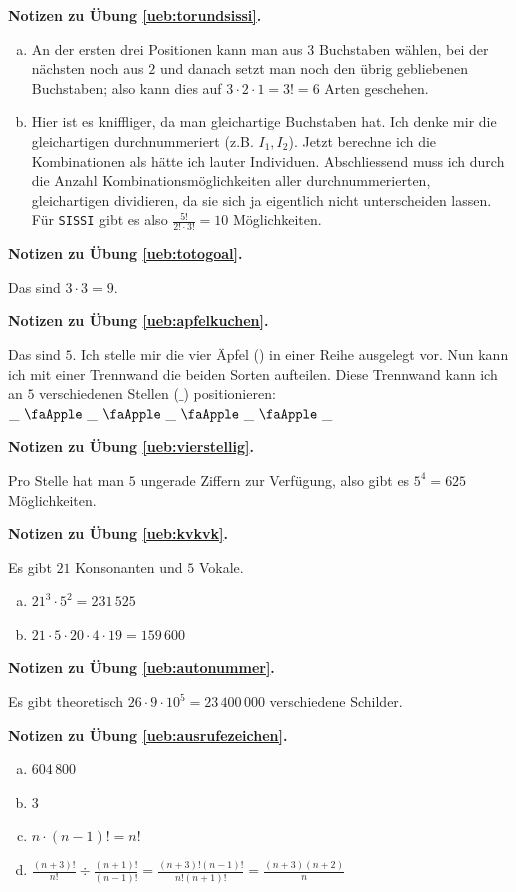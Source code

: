 \documentclass[%
11pt,%
twoside,%
titlepage,%
german,%
headsepline%
]{scrartcl}
\newcounter{theo}[section]\setcounter{theo}{0}
\newcommand{\concatueb}[1]{ueb:#1}%
\newcommand{\concatlsg}[1]{lsg:#1}%
\newenvironment{lsg}[1]{%
    \par\noindent\textbf{Notizen zu Übung \ref{\concatueb{#1}}.}%
    \label{\concatlsg{#1}}
}{%
    \par%
}
\begin{document}
\begin{lsg}{torundsissi}
\begin{enumerate}[a)]
\item An der ersten drei Positionen kann man aus $3$ Buchstaben w\"ahlen, bei der n\"achsten noch aus $2$ und danach setzt man noch den \"ubrig gebliebenen Buchstaben; also kann dies auf $3\cdot2\cdot1=3!=6$ Arten geschehen.
\item Hier ist es kniffliger, da man gleichartige Buchstaben hat. Ich denke mir die gleichartigen durchnummeriert (z.B. $I_{1}, I_{2}$). Jetzt berechne ich die Kombinationen als h\"atte ich lauter Individuen. Abschliessend muss ich durch die Anzahl Kombinationsm\"oglichkeiten aller durchnummerierten, gleichartigen dividieren, da sie sich ja eigentlich nicht unterscheiden lassen. F\"ur \texttt{SISSI} gibt es also $\frac{5!}{2!\cdot3!}=10$ M\"oglichkeiten.
\end{enumerate}
\end{lsg}
\begin{lsg}{totogoal}
Das sind $3\cdot3=9$.
\end{lsg}
\begin{lsg}{apfelkuchen}
Das sind $5$. Ich stelle mir die vier \"Apfel (\faApple) in einer Reihe ausgelegt vor. Nun kann ich mit einer Trennwand die beiden Sorten aufteilen. Diese Trennwand kann ich an $5$ verschiedenen Stellen ($\_$) positionieren:
$\_\ \text{\faApple}\ \_\ \text{\faApple}\ \_\ \text{\faApple}\ \_\ \text{\faApple}\ \_$
\end{lsg}
\begin{lsg}{vierstellig}
Pro Stelle hat man $5$ ungerade Ziffern zur Verf\"ugung, also gibt es $5^{4}=625$ M\"oglichkeiten.
\end{lsg}
\begin{lsg}{kvkvk}
Es gibt $21$ Konsonanten und $5$ Vokale.
\begin{enumerate}[a)]
\item $21^{3}\cdot5^{2}=231\,525$
\item $21\cdot5\cdot20\cdot4\cdot19=159\,600$
\end{enumerate}
\end{lsg}
\begin{lsg}{autonummer}
Es gibt theoretisch $26\cdot9\cdot10^{5}=23\,400\,000$ verschiedene Schilder.
\end{lsg}
\begin{lsg}{ausrufezeichen}
\begin{enumerate}[a)]
\item $604\,800$
\item $3$
\item $n\cdot(n-1)!=n!$
\item $\frac{(n+3)!}{n!}\div\frac{(n+1)!}{(n-1)!}=\frac{(n+3)!(n-1)!}{n!(n+1)!}=\frac{(n+3)(n+2)}{n}$
\end{enumerate}
\end{lsg}
\end{document}
